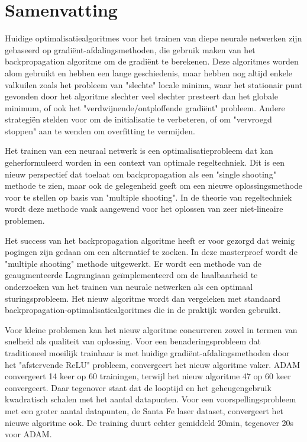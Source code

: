 \documentclass[master=wit,english]{kulemt}
\begin{document}
\chapter*{Samenvatting}
Huidige optimalisatiealgoritmes voor het trainen van diepe neurale netwerken zijn gebaseerd op gradi\"ent-afdalingsmethoden, die gebruik maken van het backpropagation algoritme om de gradi\"ent te berekenen. Deze algoritmes worden alom gebruikt en hebben een lange geschiedenis, maar hebben nog altijd enkele valkuilen zoals het probleem van "slechte" locale minima, waar het stationair punt gevonden door het algoritme slechter veel slechter presteert dan het globale minimum, of ook het "verdwijnende/ontploffende gradi\"ent" probleem. Andere strategi\"en stelden voor om de initialisatie te verbeteren, of om "vervroegd stoppen" aan te wenden om overfitting te vermijden.

Het trainen van een neuraal netwerk is een optimalisatieprobleem dat kan geherformuleerd worden in een context van optimale regeltechniek. Dit is een nieuw perspectief dat toelaat om backpropagation als een "single shooting" methode te zien, maar ook de gelegenheid geeft om een nieuwe oplossingsmethode voor te stellen op basis van "multiple shooting". In de theorie van regeltechniek wordt deze methode vaak aangewend voor het oplossen van zeer niet-lineaire problemen.

Het success van het backpropagation algoritme heeft er voor gezorgd dat weinig pogingen zijn gedaan om een alternatief te zoeken. In deze masterproef wordt de "multiple shooting" methode uitgewerkt. Er wordt een methode van de geaugmenteerde Lagrangiaan ge\"implementeerd om de haalbaarheid te onderzoeken van het trainen van neurale netwerken als een optimaal sturingsprobleem. Het nieuw algoritme wordt dan vergeleken met standaard backpropagation-optimalisatiealgoritmes die in de praktijk worden gebruikt.

Voor kleine problemen kan het nieuw algoritme concurreren zowel in termen van snelheid als qualiteit van oplossing. Voor een benaderingsprobleem dat traditioneel moeilijk trainbaar is met huidige gradi\"ent-afdalingsmethoden door het "afstervende ReLU" probleem, convergeert het nieuw algoritme vaker. ADAM convergeert 14 keer op 60 trainingen, terwijl het nieuw algoritme 47 op 60 keer convergeert. Daar tegenover staat dat de looptijd en het geheugengebruik kwadratisch schalen met het aantal datapunten. Voor een voorspellingsprobleem met een groter aantal datapunten, de Santa Fe laser dataset, convergeert het nieuwe algoritme ook. De training duurt echter gemiddeld 20min, tegenover 20s voor ADAM.
\end{document}
